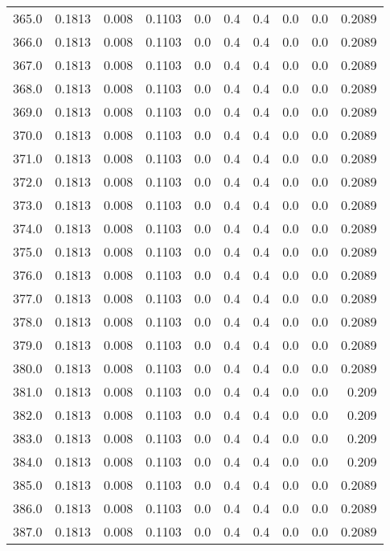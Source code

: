 \begin{longtable}{lrrrrrrrrr}
365.0 & 0.1813 & 0.008 & 0.1103 & 0.0 & 0.4 & 0.4 & 0.0 & 0.0 & 0.2089 \\
366.0 & 0.1813 & 0.008 & 0.1103 & 0.0 & 0.4 & 0.4 & 0.0 & 0.0 & 0.2089 \\
367.0 & 0.1813 & 0.008 & 0.1103 & 0.0 & 0.4 & 0.4 & 0.0 & 0.0 & 0.2089 \\
368.0 & 0.1813 & 0.008 & 0.1103 & 0.0 & 0.4 & 0.4 & 0.0 & 0.0 & 0.2089 \\
369.0 & 0.1813 & 0.008 & 0.1103 & 0.0 & 0.4 & 0.4 & 0.0 & 0.0 & 0.2089 \\
370.0 & 0.1813 & 0.008 & 0.1103 & 0.0 & 0.4 & 0.4 & 0.0 & 0.0 & 0.2089 \\
371.0 & 0.1813 & 0.008 & 0.1103 & 0.0 & 0.4 & 0.4 & 0.0 & 0.0 & 0.2089 \\
372.0 & 0.1813 & 0.008 & 0.1103 & 0.0 & 0.4 & 0.4 & 0.0 & 0.0 & 0.2089 \\
373.0 & 0.1813 & 0.008 & 0.1103 & 0.0 & 0.4 & 0.4 & 0.0 & 0.0 & 0.2089 \\
374.0 & 0.1813 & 0.008 & 0.1103 & 0.0 & 0.4 & 0.4 & 0.0 & 0.0 & 0.2089 \\
375.0 & 0.1813 & 0.008 & 0.1103 & 0.0 & 0.4 & 0.4 & 0.0 & 0.0 & 0.2089 \\
376.0 & 0.1813 & 0.008 & 0.1103 & 0.0 & 0.4 & 0.4 & 0.0 & 0.0 & 0.2089 \\
377.0 & 0.1813 & 0.008 & 0.1103 & 0.0 & 0.4 & 0.4 & 0.0 & 0.0 & 0.2089 \\
378.0 & 0.1813 & 0.008 & 0.1103 & 0.0 & 0.4 & 0.4 & 0.0 & 0.0 & 0.2089 \\
379.0 & 0.1813 & 0.008 & 0.1103 & 0.0 & 0.4 & 0.4 & 0.0 & 0.0 & 0.2089 \\
380.0 & 0.1813 & 0.008 & 0.1103 & 0.0 & 0.4 & 0.4 & 0.0 & 0.0 & 0.2089 \\
381.0 & 0.1813 & 0.008 & 0.1103 & 0.0 & 0.4 & 0.4 & 0.0 & 0.0 & 0.209 \\
382.0 & 0.1813 & 0.008 & 0.1103 & 0.0 & 0.4 & 0.4 & 0.0 & 0.0 & 0.209 \\
383.0 & 0.1813 & 0.008 & 0.1103 & 0.0 & 0.4 & 0.4 & 0.0 & 0.0 & 0.209 \\
384.0 & 0.1813 & 0.008 & 0.1103 & 0.0 & 0.4 & 0.4 & 0.0 & 0.0 & 0.209 \\
385.0 & 0.1813 & 0.008 & 0.1103 & 0.0 & 0.4 & 0.4 & 0.0 & 0.0 & 0.2089 \\
386.0 & 0.1813 & 0.008 & 0.1103 & 0.0 & 0.4 & 0.4 & 0.0 & 0.0 & 0.2089 \\
387.0 & 0.1813 & 0.008 & 0.1103 & 0.0 & 0.4 & 0.4 & 0.0 & 0.0 & 0.2089 \\

\end{longtable}
